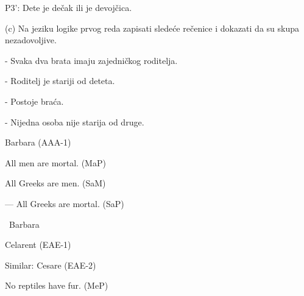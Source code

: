 \begin{isabellebody}
\begin{exercise}[subtitle=Zapisivanje logičkih formula (nastavak)]
%
\begin{isamarkuptext}%
P3': Dete je dečak ili je devojčica.%
\end{isamarkuptext}\isamarkuptrue%
%
\begin{isamarkuptext}%
(c) Na jeziku logike prvog reda zapisati sledeće rečenice i dokazati da su skupa nezadovoljive.%
\end{isamarkuptext}\isamarkuptrue%
%
\begin{isamarkuptext}%
- Svaka dva brata imaju zajedničkog roditelja.%
\end{isamarkuptext}\isamarkuptrue%
%
\begin{isamarkuptext}%
- Roditelj je stariji od deteta.%
\end{isamarkuptext}\isamarkuptrue%
%
\begin{isamarkuptext}%
- Postoje braća.%
\end{isamarkuptext}\isamarkuptrue%
%
\begin{isamarkuptext}%
- Nijedna osoba nije starija od druge.%
\end{isamarkuptext}\isamarkuptrue%
%
\end{exercise}
%
\begin{exercise}[subtitle=Silogizmi]
%
\begin{isamarkuptext}%
Barbara (AAA-1)%
\end{isamarkuptext}\isamarkuptrue%
%
\begin{isamarkuptext}%
All men are mortal. (MaP)%
\end{isamarkuptext}\isamarkuptrue%
%
\begin{isamarkuptext}%
All Greeks are men. (SaM)%
\end{isamarkuptext}\isamarkuptrue%
%
\begin{isamarkuptext}%
— All Greeks are mortal. (SaP)%
\end{isamarkuptext}\isamarkuptrue%
\isamarkupfalse%
\ Barbara{\isacharcolon}{\kern0pt}\ %
\isadelimproof
%
\endisadelimproof
%
\isatagproof
%
\endisatagproof
{\isafoldproof}%
%
\isadelimproof
%
\endisadelimproof
%
\begin{isamarkuptext}%
Celarent (EAE-1)%
\end{isamarkuptext}\isamarkuptrue%
%
\begin{isamarkuptext}%
Similar: Cesare (EAE-2)%
\end{isamarkuptext}\isamarkuptrue%
%
\begin{isamarkuptext}%
No reptiles have fur. (MeP)%
\end{isamarkuptext}\isamarkuptrue%

\end{exercise}
\end{isabellebody}
